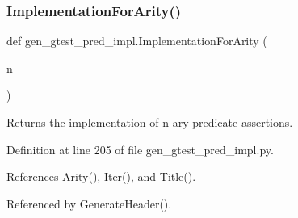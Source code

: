 \subsubsection{\texorpdfstring{Implementation\+For\+Arity()}{ImplementationForArity()}}
{\footnotesize\ttfamily def gen\+\_\+gtest\+\_\+pred\+\_\+impl.\+Implementation\+For\+Arity (\begin{DoxyParamCaption}\item[{}]{n }\end{DoxyParamCaption})}

\begin{DoxyVerb}Returns the implementation of n-ary predicate assertions.\end{DoxyVerb}
 

Definition at line 205 of file gen\+\_\+gtest\+\_\+pred\+\_\+impl.\+py.



References Arity(), Iter(), and Title().



Referenced by Generate\+Header().


